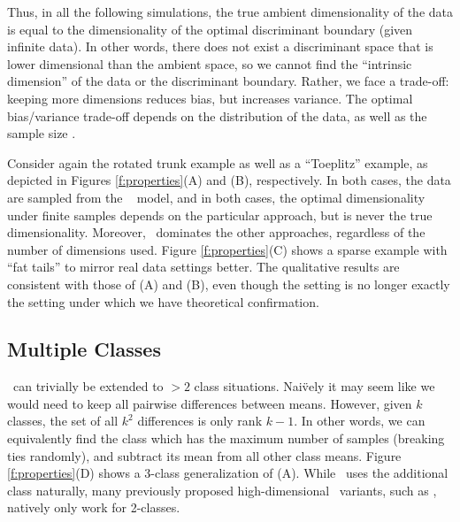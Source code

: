 \documentclass[10pt]{article}
\begin{document}
Thus, in all the following simulations, the true ambient dimensionality of the data is equal to the dimensionality of the optimal discriminant boundary (given infinite data).  In other words, there does not exist a discriminant space that is lower dimensional than the ambient space, so we cannot find the ``intrinsic dimension'' of the data or the discriminant boundary.  Rather, we face a trade-off: keeping more dimensions reduces bias, but increases variance.  The optimal bias/variance trade-off depends on the distribution of the data, as well as the sample size \cite{Trunk1979a}.  



Consider again the rotated trunk example as well as a ``Toeplitz'' example, as depicted in Figures \ref{f:properties}(A) and (B), respectively.  In both cases, the data are sampled from the \Lda~ model, and in both cases, the optimal dimensionality under finite samples depends on the particular approach, but is never the true dimensionality.  Moreover, \Lol~dominates the other approaches, regardless of the number of dimensions used.
% 
Figure \ref{f:properties}(C) shows a sparse example with ``fat tails'' to mirror real data settings better.  The qualitative results are consistent with those of (A) and (B), even though the setting is no longer exactly the setting under which we have theoretical confirmation.


\subsection*{Multiple Classes}

\Lol~can trivially be extended to $>2$ class situations.  Nai\"vely it may seem like we would need to keep all pairwise differences between means.  However, given $k$ classes, the set of all $k^2$ differences is only rank $k-1$.  In other words, we can equivalently find the class which has the maximum number of samples (breaking ties randomly), and subtract its mean from all other class means.  Figure \ref{f:properties}(D) shows a 3-class generalization of (A).  While \Lol~uses the additional class naturally,  many previously proposed high-dimensional \Fld~variants, such as , natively only work for 2-classes. 
\end{document}
